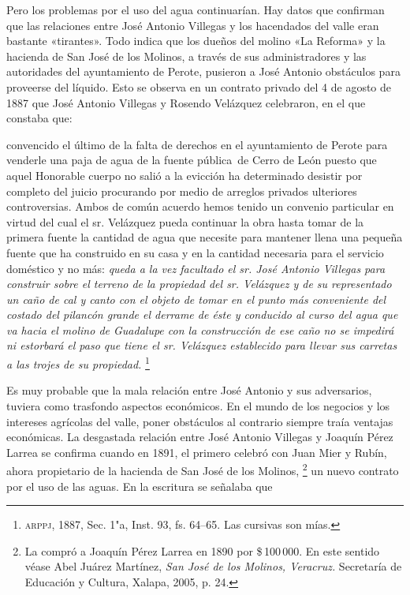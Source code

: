 \documentclass[14pt,twoside,final]{extbook} %
\let\oldfootnote\footnote
\renewcommand\footnote[1]{%
\oldfootnote{\hspace{1mm}#1}}
\begin{document}
Pero los problemas por el uso del agua continuarían. Hay datos que confirman que las relaciones entre José Antonio Villegas y los hacendados del valle eran bastante «tirantes». Todo indica que los dueños del molino «La Reforma» y la hacienda de San José de los Molinos, a través de sus administradores y las autoridades del ayuntamiento de Perote, pusieron a José Antonio obstáculos para proveerse del líquido. Esto se observa en un contrato privado del 4 de agosto de 1887 que José Antonio Villegas y Rosendo Velázquez celebraron, en el que constaba que:
\begin{quoting}
convencido el último de la falta de derechos en el ayuntamiento de Perote para venderle una paja de agua de la fuente pública~de Cerro de León puesto que aquel Honorable cuerpo no salió a la evicción ha determinado desistir por completo del juicio procurando por medio de arreglos privados ulteriores controversias. Ambos de común acuerdo hemos tenido un convenio particular en virtud del cual el sr. Velázquez pueda continuar la obra hasta tomar de la primera fuente la cantidad de agua que necesite para mantener llena una pequeña fuente que ha construido en su casa y en la cantidad necesaria para el servicio doméstico y no más: \emph{queda a la vez facultado el sr. José Antonio Villegas para construir sobre el terreno de la propiedad del sr. Velázquez y de su representado un caño de cal y canto con el objeto de tomar en el punto más conveniente del costado del pilancón grande el derrame de éste y conducido al curso del agua que va hacia el molino de Guadalupe con la construcción de ese caño no se impedirá ni estorbará el paso que tiene el sr. Velázquez establecido para llevar sus carretas a las trojes de su propiedad.}\footnote{\textsc{arppj}, 1887, Sec. 1"a, Inst. 93, fs. 64--65. Las cursivas son mías.}
\end{quoting}
Es muy probable que la mala relación entre José Antonio y sus adversarios, tuviera como trasfondo aspectos económicos. En el mundo de los negocios y los intereses agrícolas del valle, poner obstáculos al contrario siempre traía ventajas económicas. La desgastada relación entre José Antonio Villegas y Joaquín Pérez Larrea se confirma cuando en 1891, el primero celebró con Juan Mier y Rubín, ahora propietario de la hacienda de San José de los Molinos,\footnote{La compró a Joaquín Pérez Larrea en 1890 por \$\,100\,000. En este sentido véase Abel Juárez Martínez, \emph{San José de los Molinos, Veracruz.} Secretaría de Educación y Cultura, Xalapa, 2005, p. 24.} un nuevo contrato por el uso de las aguas. En la escritura se señalaba que
\end{document}
